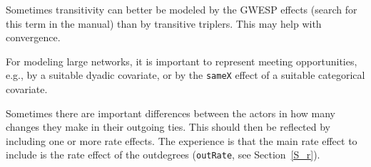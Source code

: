 \documentclass[a4paper,fleqn,11pt]{article}
\newcommand{\+}{\, + \,}
\begin{document}
\begin{itemize}
      Sometimes transitivity can better be modeled by the GWESP effects
      (search for this term in the manual) than by transitive triplers.
      This may help with convergence.

      For modeling large networks, it is important to represent
      meeting opportunities, e.g., by a suitable dyadic covariate,
      or by the \texttt{sameX} effect of a suitable categorical covariate.

      Sometimes there are important differences between the actors in how many
      changes they make in their outgoing ties. This should then
      be reflected by including one or more rate effects.
      The experience is that the main rate effect to include
      is the rate effect of the outdegrees (\texttt{outRate},
      see Section~\ref{S_r}).


\end{itemize}
\end{document}

